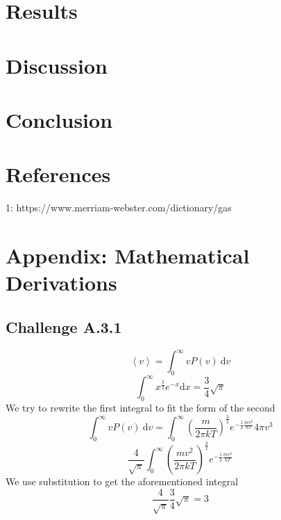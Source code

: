 \documentclass[reprint,english,notitlepage]{revtex4-2}
\begin{document}
\section{Results}
\section{Discussion}
\section{Conclusion}
\section{References}
1: https://www.merriam-webster.com/dictionary/gas
\section{Appendix: Mathematical Derivations}
	\subsection*{Challenge A.3.1}
	\[
	\left< v \right> =  \int_{0}^{\infty} vP(v) \ \mathrm{d}v
	\]
	\[
	\int_{0}^{\infty} x^{\frac{3}{2}} e^{-x} \mathrm{d}x = \frac{3}{4} \sqrt{\pi}  
	\]
	We try to rewrite the first integral to fit the form of the second 
	\[
	\int _{0}^{\infty} vP(v) \ \mathrm{d}v = \int _{0}^{\infty} \left( \frac{m}{2 \pi k T} \right) ^{\frac{3}{2}} e ^{-\frac{1}{2} \frac{mv^{2}}{k T}} 4 \pi v^{3}
	\]\newline 
	\[
	\frac{4}{\sqrt{\pi}} \int _{0}^{\infty} \left( \frac{mv^{2}}{2 \pi k T} \right) ^{\frac{3}{2}} e ^{-\frac{1}{2} \frac{mv^{2}}{k T}} 
	\]
	We use substitution to get the aforementioned integral
	\[
	\frac{4}{\sqrt{\pi}} \frac{3}{4} \sqrt{\pi} = 3
	\]
\end{document}
